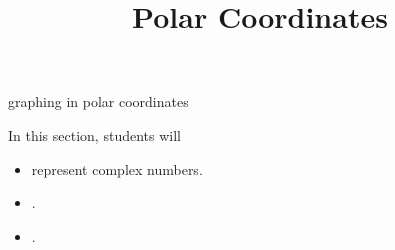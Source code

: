 \documentclass{ximera}
\title{Polar Coordinates}
\begin{document}
\begin{abstract}
\end{abstract}
\maketitle





graphing in polar coordinates


\begin{sectionOutcomes}
In this section, students will 

\begin{itemize}
\item represent complex numbers.
\item .
\item .
\end{itemize}
\end{sectionOutcomes}
\end{document}
